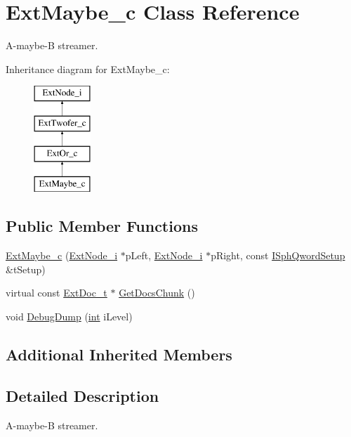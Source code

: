 \hypertarget{classExtMaybe__c}{\section{Ext\-Maybe\-\_\-c Class Reference}
\label{classExtMaybe__c}
}


A-\/maybe-\/\-B streamer.  


Inheritance diagram for Ext\-Maybe\-\_\-c\-:\begin{figure}[H]
\begin{center}
\leavevmode
\includegraphics[height=4.000000cm]{classExtMaybe__c}
\end{center}
\end{figure}
\subsection*{Public Member Functions}
\begin{DoxyCompactItemize}
\item 
\hyperlink{classExtMaybe__c_ae4096355557626facaed8ce6269a80f3}{Ext\-Maybe\-\_\-c} (\hyperlink{classExtNode__i}{Ext\-Node\-\_\-i} $\ast$p\-Left, \hyperlink{classExtNode__i}{Ext\-Node\-\_\-i} $\ast$p\-Right, const \hyperlink{classISphQwordSetup}{I\-Sph\-Qword\-Setup} \&t\-Setup)
\item 
virtual const \hyperlink{structExtDoc__t}{Ext\-Doc\-\_\-t} $\ast$ \hyperlink{classExtMaybe__c_a62de9ed66836bdd2b8a2e95a2d62aa0f}{Get\-Docs\-Chunk} ()
\item 
void \hyperlink{classExtMaybe__c_a2957c3365b225a96675803a013efbf29}{Debug\-Dump} (\hyperlink{sphinxexpr_8cpp_a4a26e8f9cb8b736e0c4cbf4d16de985e}{int} i\-Level)
\end{DoxyCompactItemize}
\subsection*{Additional Inherited Members}


\subsection{Detailed Description}
A-\/maybe-\/\-B streamer. 

